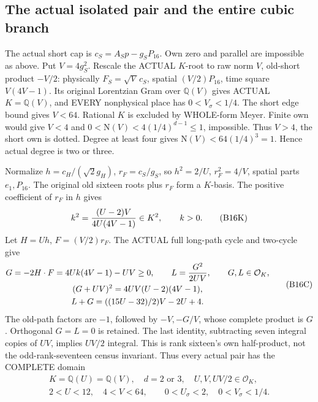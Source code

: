\documentclass[11pt]{article}
\begin{document}
\subsection{The actual isolated pair and the entire cubic branch}
\label{app:arithB16cubic}

The actual short cap is
\(c_S=A_Sp-g_SP_{16}\).
Own zero and parallel are impossible as above.
Put \(V=4g_S^2\).
Rescale the ACTUAL \(K\)-root to raw norm \(V\),
old-short product \(-V/2\):
physically \(F_S=\sqrt V\,c_S\), spatial
\((V/2)P_{16}\), time square \(V(4V-1)\).
Its original Lorentzian Gram over \(\mathbb Q(V)\)
gives ACTUAL \(K=\mathbb Q(V)\), and EVERY
nonphysical place has \(0<V_\sigma<1/4\).
The short edge bound gives \(V<64\).
Rational \(K\) is excluded by WHOLE-form Meyer.
Finite own would give \(V<4\) and
\(0<\mathrm N(V)<4(1/4)^{d-1}\le1\), impossible.
Thus \(V>4\), the short own is dotted.
Degree at least four gives
\(\mathrm N(V)<64(1/4)^3=1\).
Hence actual degree is two or three.

Normalize \(h=c_H/(\sqrt2g_H)\),
\(r_F=c_S/g_S\), so
\(h^2=2/U\), \(r_F^2=4/V\), spatial parts
\(e_1,P_{16}\).
The original old sixteen roots plus \(r_F\)
form a \(K\)-basis.
The positive coefficient of \(r_F\) in \(h\) gives
\[
                   k^2={(U-2)V\over4U(4V-1)}\in K^2,
                   \qquad k>0 .
\tag{B16K}\label{eq:arithB16square}
\]
Let \(H=Uh\), \(F=(V/2)r_F\).
The ACTUAL full long-path cycle and two-cycle give
\[
 \begin{gathered}
 G=-2H\cdot F=4Uk(4V-1)-UV\ge0,\qquad
 L={G^2\over2UV},\qquad G,L\in\mathcal O_K,\\
 (G+UV)^2=4UV(U-2)(4V-1),\\
 L+G=((15U-32)/2)V-2U+4 .
 \end{gathered}
\tag{B16C}\label{eq:arithB16cycles}
\]
The old-path factors are \(-1\), followed by
\(-V,-G/V\), whose complete product is \(G\).
Orthogonal \(G=L=0\) is retained.
The last identity, subtracting seven integral
copies of \(UV\), implies \(UV/2\) integral.
This is rank sixteen's own half-product, not
the odd-rank-seventeen census invariant.
Thus every actual pair has the COMPLETE domain
\[
 \begin{gathered}
 K=\mathbb Q(U)=\mathbb Q(V),\quad d=2\text{ or }3,\quad
 U,V,UV/2\in\mathcal O_K,\\
 2<U<12,\quad4<V<64,\qquad
 0<U_\sigma<2,\quad0<V_\sigma<1/4 .
 \end{gathered}
\]
\end{document}
